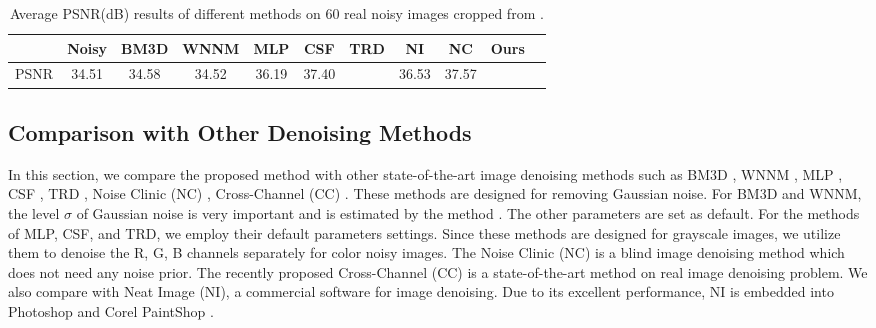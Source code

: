 \documentclass[10pt,twocolumn,letterpaper]{article}
\begin{document}
\begin{table}
\caption{Average PSNR(dB) results of different methods on 60 real noisy images cropped from \cite{crosschannel2016}.}
\label{tab2}
\begin{center}
\renewcommand\arraystretch{1}
\begin{tabular}{|c||c|c|c|c|c|c|c|c|c|c|}
\hline
 & \textbf{Noisy} &\textbf{BM3D}&\textbf{WNNM}&\textbf{MLP}&\textbf{CSF}&\textbf{TRD}& \textbf{NI}& \textbf{NC} &\textbf{Ours} 
\\
\hline
PSNR & 34.51 & 34.58 & 34.52 & 36.19 & 37.40 & {\color{blue}{37.75}} & 36.53 & 37.57  & {\color{red}{ 38.75}}
\\
\hline
\end{tabular}
\end{center}\vspace{-6mm}
\end{table}

\subsection{Comparison with Other Denoising Methods}

In this section, we compare the proposed method with other state-of-the-art image denoising methods such as BM3D \cite{bm3d}, WNNM \cite{wnnm}, MLP \cite{mlp}, CSF \cite{csf}, TRD \cite{chen2015learning}, Noise Clinic (NC) \cite{noiseclinic}, Cross-Channel (CC) \cite{crosschannel2016}. These methods are designed for removing Gaussian noise. For BM3D and WNNM, the level $\sigma$ of Gaussian noise is very important and is estimated by the method \cite{noiselevel}. The other parameters are set as default. For the methods of MLP, CSF, and TRD, we employ their default parameters settings. Since these methods are designed for grayscale images, we utilize them to denoise the R, G, B channels separately for color noisy images. The Noise Clinic (NC) \cite{noiseclinic} is a blind image denoising method which does not need any noise prior. The recently proposed Cross-Channel (CC) \cite{crosschannel2016} is a state-of-the-art method on real image denoising problem. We also compare with Neat Image (NI), a commercial software for image denoising. Due to its excellent performance, NI is embedded into Photoshop and Corel PaintShop \cite{neatimage}.
\end{document}

